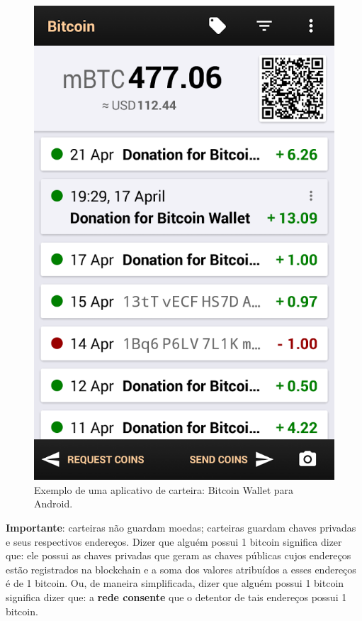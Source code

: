 \begin{figure}[h!]
	\centering
	\includegraphics[scale=0.32]{./images/carteira.png}
	\caption[Exemplo de uma aplicativo de carteira: Bitcoin Wallet para Android.]{Exemplo de uma aplicativo de carteira: Bitcoin Wallet para Android\protect\footnotemark. \label{fig:carteira}}
\end{figure}

\textbf	{Importante}: carteiras não guardam moedas; carteiras guardam chaves privadas e seus respectivos endereços. Dizer que alguém possui 1 bitcoin significa dizer que: ele possui as chaves privadas que geram as chaves públicas cujos endereços estão registrados na blockchain e a soma dos valores atribuídos a esses endereços é de 1 bitcoin. Ou, de maneira simplificada, dizer que alguém possui 1 bitcoin significa dizer que: a \textbf{rede consente} que o detentor de tais endereços possui 1 bitcoin.

